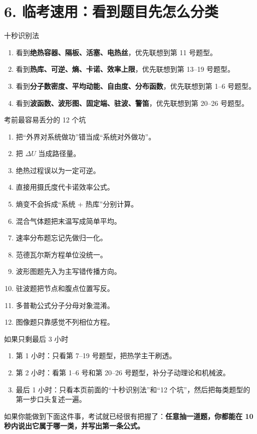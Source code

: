 \documentclass[11pt,a4paper]{ctexart}
\newcommand{\key}[1]{\textcolor{theme}{\textbf{#1}}}
\begin{document}
\section*{6. 临考速用：看到题目先怎么分类}

\begin{tipbox}{十秒识别法}
\begin{enumerate}
  \item 看到\key{绝热容器、隔板、活塞、电热丝}，优先联想到第 11 号题型。
  \item 看到\key{热库、可逆、熵、卡诺、效率上限}，优先联想到第 13--19 号题型。
  \item 看到\key{分子数密度、平均动能、自由度、分布函数}，优先联想到第 1--6 号题型。
  \item 看到\key{波函数、波形图、固定端、驻波、警笛}，优先联想到第 20--26 号题型。
\end{enumerate}
\end{tipbox}

\begin{warnbox}{考前最容易丢分的 12 个坑}
\begin{enumerate}
  \item 把“外界对系统做功”错当成“系统对外做功”。
  \item 把 \(\Delta U\) 当成路径量。
  \item 绝热过程误以为一定可逆。
  \item 直接用摄氏度代卡诺效率公式。
  \item 熵变不会拆成“系统 + 热库”分别计算。
  \item 混合气体题把末温写成简单平均。
  \item 速率分布题忘记先做归一化。
  \item 范德瓦尔斯方程单位没统一。
  \item 波形图题先入为主写错传播方向。
  \item 驻波题把节点和腹点位置写反。
  \item 多普勒公式分子分母对象混淆。
  \item 图像题只靠感觉不列相位方程。
\end{enumerate}
\end{warnbox}

\begin{introbox}{如果只剩最后 3 小时}
\begin{enumerate}
  \item 第 1 小时：只看第 7--19 号题型，把热学主干刷透。
  \item 第 2 小时：看第 1--6 号和第 20--26 号题型，补分子动理论和机械波。
  \item 最后 1 小时：只看本页前面的“十秒识别法”和“12 个坑”，然后把每类题型的第一步口头复述一遍。
\end{enumerate}
如果你能做到下面这件事，考试就已经很有把握了：\key{任意抽一道题，你都能在 10 秒内说出它属于哪一类，并写出第一条公式。}
\end{introbox}
\end{document}
